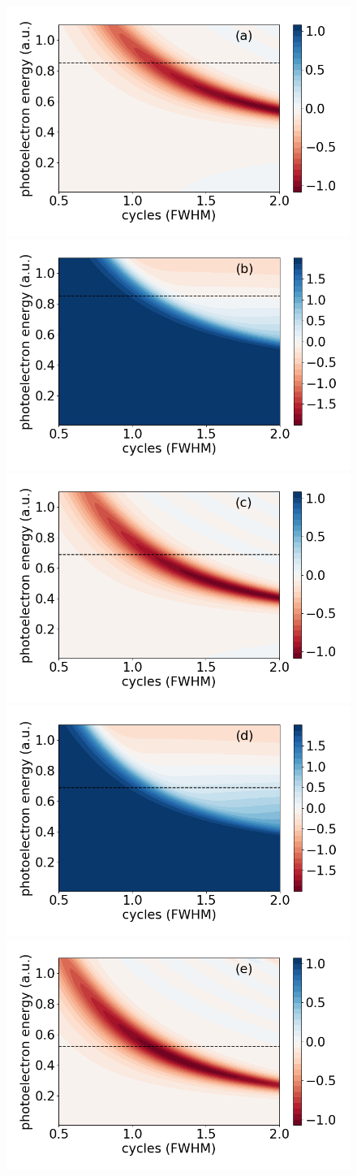 \begin{figure}[!ht]
\centering
\includegraphics[width=0.40\linewidth]{figs/Photo_ionization/short_pulse/energy_d1p1_beta_1_I_1_heat.png}
\includegraphics[width=0.40\linewidth]{figs/Photo_ionization/short_pulse/energy_d1p1_beta_2_I_1_heat.png}\\
\includegraphics[width=0.40\linewidth]{figs/Photo_ionization/short_pulse/energy_d1p0_beta_1_I_1_heat.png}
\includegraphics[width=0.40\linewidth]{figs/Photo_ionization/short_pulse/energy_d1p0_beta_2_I_1_heat.png}\\
\includegraphics[width=0.40\linewidth]{figs/Photo_ionization/short_pulse/energy_d0p9_beta_1_I_1_heat.png}

\end{figure}
